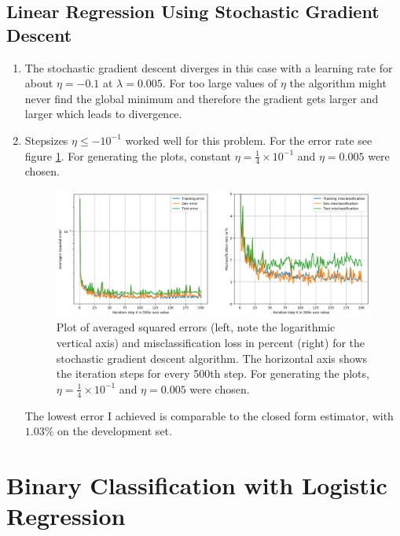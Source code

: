 \documentclass[12pt]{article}
\begin{document}
\subsection{Linear Regression Using Stochastic Gradient Descent}

\begin{enumerate}
	\item The stochastic gradient descent diverges in this case with a learning rate for about $\eta=-0.1$ at $\lambda=0.005$. For too large values of $\eta$ the algorithm might never find the global minimum and therefore the gradient gets larger and larger which leads to divergence. 
	\item  Stepsizes $\eta \le -10^{-1} $ worked well for this problem. For the error rate see figure \ref{fig:1.3}. For generating the plots, constant $\eta = \frac{1}{4}\times 10^{-1}$ and $\eta=0.005$ were chosen.
	\begin{figure}[h!]
		\centering
		\includegraphics[width=0.85\linewidth]{./Problem_1/Problem_1.3.png}
		\caption{Plot of averaged squared errors (left, note the logarithmic vertical axis) and misclassification loss in percent (right) for the stochastic gradient descent algorithm. The horizontal axis shows the iteration steps for every 500th step. For generating the plots, $\eta = \frac{1}{4}\times 10^{-1}$ and $\eta=0.005$ were chosen.}
		\label{fig:1.3}
	\end{figure}
	The lowest error I achieved is comparable to the closed form estimator, with $1.03\%$ on the development set. 
	
	
	
	
\end{enumerate}


\newpage

\section{Binary Classification with Logistic Regression}
\end{document}
